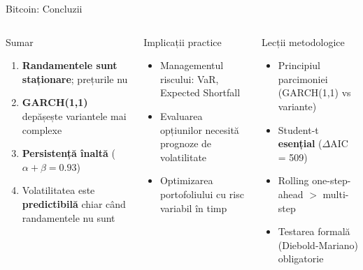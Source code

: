 \documentclass[9pt, aspectratio=169, t]{beamer}
\begin{document}
\begin{frame}{Bitcoin: Concluzii}
    \begin{columns}[T]
        \begin{block}{Sumar}
            \begin{enumerate}\setlength{\itemsep}{0pt}
                \item \textbf{Randamentele sunt staționare}; prețurile nu
                \item \textbf{GARCH(1,1)} depășește variantele mai complexe
                \item \textbf{Persistență înaltă} ($\alpha + \beta = 0.93$)
                \item Volatilitatea este \textbf{predictibilă} chiar când randamentele nu sunt
            \end{enumerate}
        \end{block}

        \vspace{0.3cm}

        \begin{exampleblock}{Implicații practice}
            \begin{itemize}\setlength{\itemsep}{0pt}
                \item Managementul riscului: VaR, Expected Shortfall
                \item Evaluarea opțiunilor necesită prognoze de volatilitate
                \item Optimizarea portofoliului cu risc variabil în timp
            \end{itemize}
        \end{exampleblock}

        \begin{alertblock}{Lecții metodologice}
            \begin{itemize}\setlength{\itemsep}{0pt}
                \item Principiul parcimoniei (GARCH(1,1) vs variante)
                \item Student-t \textbf{esențial} ($\Delta$AIC = 509)
                \item Rolling one-step-ahead $>$ multi-step
                \item Testarea formală (Diebold-Mariano) obligatorie
            \end{itemize}
        \end{alertblock}
    \end{columns}
\end{frame}
\end{document}

